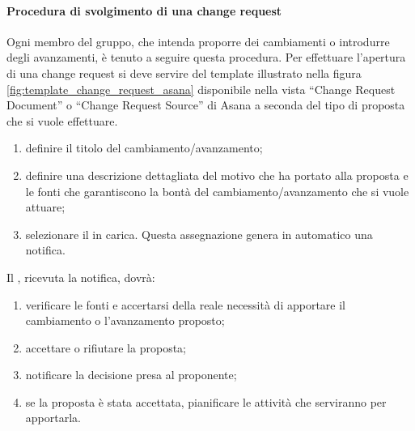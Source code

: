 			\paragraph{Procedura di svolgimento di una change request} %
			\label{par:procedura_di_svolgimento_di_una_change_request}
			Ogni membro del gruppo, che intenda proporre dei cambiamenti o introdurre degli avanzamenti, è tenuto a seguire questa procedura. \newline
			Per effettuare l'apertura di una change request si deve servire del template illustrato nella figura \ref{fig:template_change_request_asana} disponibile nella vista ``Change Request Document'' o ``Change Request Source'' di Asana a seconda del tipo di proposta che si vuole effettuare.
				\begin{enumerate}
					\item definire il titolo del cambiamento/avanzamento;
					\item definire una descrizione dettagliata del motivo che ha portato alla proposta e le fonti che garantiscono la bontà del cambiamento/avanzamento che si vuole attuare;
					\item selezionare il \roleProjectManager{} in carica. Questa assegnazione genera in automatico una notifica.
				\end{enumerate}
			\noindent
			Il \roleProjectManager{}, ricevuta la notifica, dovrà:
			 	\begin{enumerate}
			 		\item verificare le fonti e accertarsi della reale necessità di apportare il cambiamento o l'avanzamento proposto;
			 		\item accettare o rifiutare la proposta;
					\item notificare la decisione presa al proponente;
					\item se la proposta è stata accettata, pianificare le attività che serviranno per apportarla.
			 	\end{enumerate}
			

